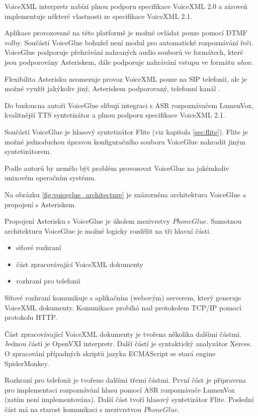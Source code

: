 \documentclass[ing,male,java,dept460,twoside]{diploma}						%
\begin{document}
VoiceXML interpretr nabízí plnou podporu specifikace VoiceXML 2.0 a zároveň implementuje některé vlastnosti ze specifikace VoiceXML 2.1.

Aplikace provozované na této platformě je možné ovládat pouze pomocí DTMF volby. Součástí VoiceGlue bohužel není modul pro automatické rozpoznávání řeči. VoiceGlue podporuje přehrávání nahraných audio souborů ve formátech, které jsou podporovány Asteriskem, dále podporuje nahrávání vstupu ve formátu $ulaw$.

Flexibilita Asterisku neomezuje provoz VoiceXML pouze na SIP telefonii, ale je možné využít jakýkoliv jiný, Asteriskem podporovaný, telefonní kanál \cite{voiceglue_architecture}.

Do budoucna autoři VoiceGlue slibují integraci s ASR rozpoznávačem LumenVox, kvalitnější TTS syntetizátor a plnou podporu specifikace VoiceXML 2.1.

Součástí VoiceGlue je hlasový syntetizátor Flite (viz kapitola \ref{sec:flite}). Flite je možné jednoduchou úpravou konfiguračního souboru VoiceGlue nahradit jiným syntetizátorem.

Podle autorů by nemělo být problém provozovat VoiceGlue na jakémkoliv unixovém operačním systému.

Na obrázku \ref{fig:voiceglue_architecture} je znázorněna architektura VoiceGlue a propojení s Asteriskem.

Propojení Asterisku s VoiceGlue je úkolem mezivrstvy $PhoneGlue$. Samotnou architekturu VoiceGlue je možné logicky rozdělit na tři hlavní části.

\begin{itemize}
\item síťové rozhraní
\item část zpracovávající VoiceXML dokumenty
\item rozhraní pro telefonii
\end{itemize}

Síťové rozhraní komunikuje s aplikačním (webovým) serverem, který generuje VoiceXML dokumenty. Komunikace probíhá nad protokolem TCP/IP pomocí protokolu HTTP.

Část zpracovávající VoiceXML dokumenty je tvořena několika dalšími částmi. Jednou částí je OpenVXI interpretr. Další částí je syntaktický analyzátor Xerces. O zpracování případných skriptů jazyka ECMAScript se stará engine SpiderMonkey.

Rozhraní pro telefonii je tvořeno dalšími třemi částmi. První část je připravena pro implementaci rozpoznávání hlasu pomocí ASR rozpoznávače LumenVox (zatím není implementována). Další část tvoří hlasový syntetizátor Flite. Poslední část má na starost komunikaci s mezivrstvou $PhoneGlue$. \cite{vxml_interpreters}
\end{document}
